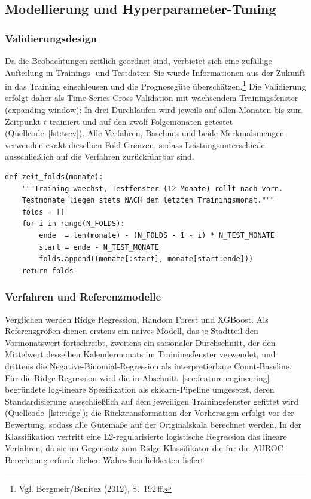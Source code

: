 \subsection{Modellierung und Hyperparameter-Tuning}
\label{sec:modellierung}

\subsubsection{Validierungsdesign}

Da die Beobachtungen zeitlich geordnet sind, verbietet sich eine zufällige
Aufteilung in Trainings- und Testdaten: Sie würde Informationen aus der
Zukunft in das Training einschleusen und die Prognosegüte
überschätzen.\footnote{Vgl. Bergmeir/Benítez (2012), S.~192\,ff.} Die
Validierung erfolgt daher als Time-Series-Cross-Validation mit wachsendem
Trainingsfenster (expanding window): In drei Durchläufen wird jeweils auf
allen Monaten bis zum Zeitpunkt $t$ trainiert und auf den zwölf
Folgemonaten getestet (Quellcode~\ref{lst:tscv}). Alle Verfahren, Baselines
und beide Merkmalsmengen verwenden exakt dieselben Fold-Grenzen, sodass
Leistungsunterschiede ausschließlich auf die Verfahren zurückführbar sind.

\begin{lstlisting}[caption={Expanding-Window-Folds über Kalendermonate
(Ausschnitt aus \texttt{modellierung/demo\_modellierung.py})},
label=lst:tscv]
def zeit_folds(monate):
    """Training waechst, Testfenster (12 Monate) rollt nach vorn.
    Testmonate liegen stets NACH dem letzten Trainingsmonat."""
    folds = []
    for i in range(N_FOLDS):
        ende  = len(monate) - (N_FOLDS - 1 - i) * N_TEST_MONATE
        start = ende - N_TEST_MONATE
        folds.append((monate[:start], monate[start:ende]))
    return folds
\end{lstlisting}

\subsubsection{Verfahren und Referenzmodelle}

Verglichen werden Ridge Regression, Random Forest und XGBoost. Als
Referenzgrößen dienen erstens ein naives Modell, das je Stadtteil den
Vormonatswert fortschreibt, zweitens ein saisonaler Durchschnitt, der den
Mittelwert desselben Kalendermonats im Trainingsfenster verwendet, und
drittens die Negative-Binomial-Regression als interpretierbare
Count-Baseline. Für die Ridge Regression wird die in
Abschnitt~\ref{sec:feature-engineering} begründete log-lineare Spezifikation
als sklearn-Pipeline umgesetzt, deren Standardisierung ausschließlich auf dem
jeweiligen Trainingsfenster gefittet wird (Quellcode~\ref{lst:ridge}); die
Rücktransformation der Vorhersagen erfolgt vor der Bewertung, sodass alle
Gütemaße auf der Originalskala berechnet werden. In der Klassifikation
vertritt eine L2-regularisierte logistische Regression das lineare
Verfahren, da sie im Gegensatz zum Ridge-Klassifikator die für die
AUROC-Berechnung erforderlichen Wahrscheinlichkeiten liefert.

